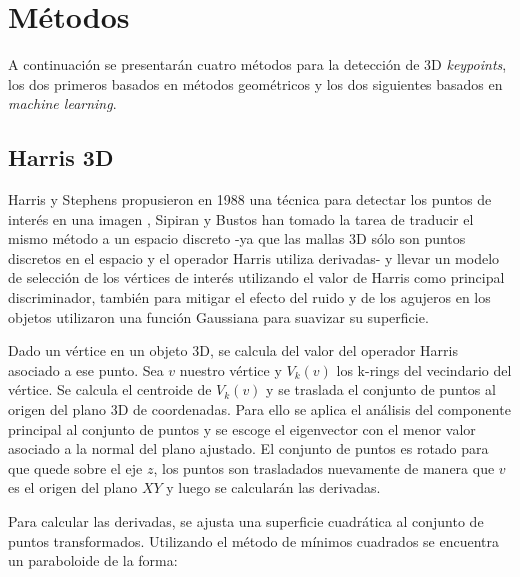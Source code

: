 \documentclass[conference]{IEEEtran}
\begin{document}




\section{Métodos}
A continuación se presentarán cuatro métodos para la detección de 3D \textit{keypoints}, los dos primeros basados en métodos geométricos y los dos siguientes basados en \textit{machine learning}.

\subsection{Harris 3D}
Harris y Stephens propusieron en 1988 una técnica para detectar los puntos de interés en una imagen \cite{corner}, Sipiran y Bustos han tomado la tarea de traducir el mismo método a un espacio discreto -ya que las mallas 3D sólo son puntos discretos en el espacio y el operador Harris utiliza derivadas- y llevar un modelo de selección de los vértices de interés utilizando el valor de Harris como principal discriminador, también para mitigar el efecto del ruido y de los agujeros en los objetos utilizaron una función Gaussiana para suavizar su superficie.

Dado un vértice en un objeto 3D, se calcula del valor del operador Harris asociado a ese punto. Sea $v$ nuestro vértice y $V_{k}(v)$ los k-rings del vecindario del vértice. Se calcula el centroide de $V_{k}(v)$ y se traslada el conjunto de puntos al origen del plano 3D de coordenadas. Para ello se aplica el análisis del componente principal al conjunto de puntos y se escoge el eigenvector con el menor valor asociado a la normal del plano ajustado. El conjunto de puntos es rotado para que quede sobre el eje $z$, los puntos son trasladados nuevamente de manera que $v$ es el origen del plano $XY$ y luego se calcularán las derivadas.

Para calcular las derivadas, se ajusta una superficie cuadrática al conjunto de puntos transformados. Utilizando el método de mínimos cuadrados se encuentra un paraboloide de la forma:
\end{document}

